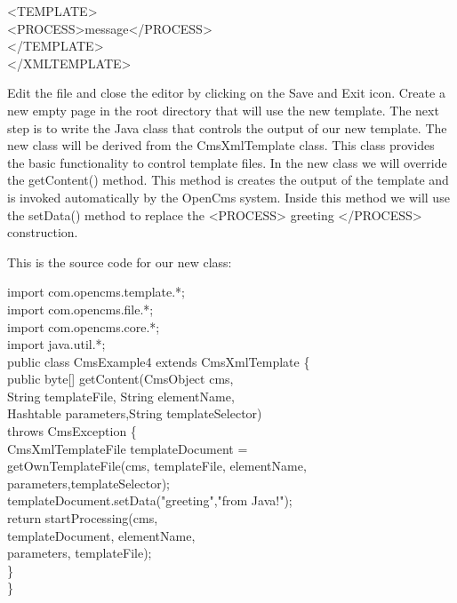 \begin{xml}
<TEMPLATE>\\
<PROCESS>message</PROCESS>\\
</TEMPLATE>\\
</XMLTEMPLATE>\\
\end{xml}

Edit the file and close the editor by clicking on  the {\name Save and Exit}
icon. Create a new empty page in the root directory that will use the
new template.
The next step is to write the Java class that controls the output of
our new template. The new class will be derived from the {\class CmsXmlTemplate}
class. This class provides the basic functionality to control template
files. In the new class we will override the {\meth getContent()} method. This
method is creates the output of the template and is invoked
automatically by the OpenCms system. Inside this method we will use the
{\meth setData()} method to replace the {\tag <PROCESS>} greeting {\tag</PROCESS>}
construction.

This is the source code for our new class:

\begin{java}
import com.opencms.template.*;\\
import com.opencms.file.*;\\
import com.opencms.core.*;\\

import java.util.*;\\

public class CmsExample4 extends CmsXmlTemplate \{\\
public byte[] getContent(CmsObject cms,\\
\jtabd        String templateFile, String elementName,\\
\jtabd        Hashtable parameters,String templateSelector)\\
\jtabd        throws CmsException \{\\
\jtabe        CmsXmlTemplateFile templateDocument =\\
\jtabe        getOwnTemplateFile(cms, templateFile, elementName,\\
\jtabf                           parameters,templateSelector);\\


\jtabe        templateDocument.setData("greeting","from Java!");\\
\jtabe        return startProcessing(cms,\\
\jtabe                               templateDocument, elementName,\\
\jtabe                               parameters, templateFile);\\
\jtabb    \}\\
\}\\
\end{java}

